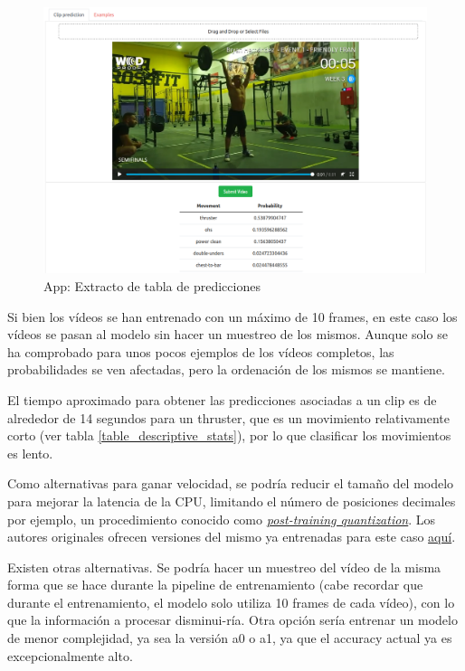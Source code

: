 \begin{figure}[H]
    \centering
		\includegraphics[width=\textwidth]{figs/app_3.png}
\caption{App: Extracto de tabla de predicciones}\label{app_3}
\end{figure}

Si bien los vídeos se han entrenado con un máximo de 10 frames, en este caso los vídeos se pasan al modelo sin hacer un muestreo de los mismos. Aunque solo se ha comprobado para unos pocos ejemplos de los vídeos completos, las probabilidades se ven afectadas, pero la ordenación de los mismos se mantiene.

El tiempo aproximado para obtener las predicciones asociadas a un clip es de alrededor de 14 segundos para un thruster, que es un movimiento relativamente corto (ver tabla \ref{table_descriptive_stats}), por lo que clasificar los movimientos es lento.

Como alternativas para ganar velocidad, se podría reducir el tamaño del modelo para mejorar la latencia de la CPU, limitando el número de posiciones decimales por ejemplo, un procedimiento conocido como \href{https://www.tensorflow.org/lite/performance/post_training_quantization}{\textit{post-training quantization}}. Los autores originales ofrecen versiones del mismo ya entrenadas para este caso \href{https://tfhub.dev/google/collections/movinet/1}{aquí}.

Existen otras alternativas. Se podría hacer un muestreo del vídeo de la misma forma que se hace durante la pipeline de entrenamiento (cabe recordar que durante el entrenamiento, el modelo solo utiliza 10 frames de cada vídeo), con lo que la información a procesar disminui-ría. Otra opción sería entrenar un modelo de menor complejidad, ya sea la versión a0 o a1, ya que el accuracy actual ya es excepcionalmente alto.




